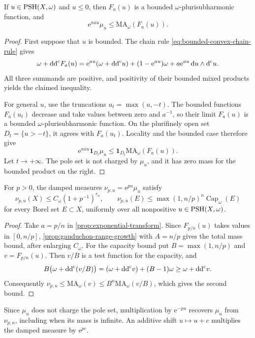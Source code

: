 \begin{proposition}\label{prop:exponential-transform}
If $u\in\mathrm{PSH}(X,\omega)$ and $u\leq0$, then $F_a(u)$ is a bounded $\omega$-plurisubharmonic function, and
\[
 \mathrm{e}^{na u}\mu_u\leq\mathrm{MA}_\omega(F_a(u)).
\]
\end{proposition}
\begin{proof}
First suppose that $u$ is bounded. The chain rule \eqref{eq:bounded-convex-chain-rule} gives
\[
 \omega+\mathrm{dd}^{\mathrm{c}} F_a(u)
 =\mathrm{e}^{au}(\omega+\mathrm{dd}^{\mathrm{c}} u)+(1-\mathrm{e}^{au})\omega
      +a\mathrm{e}^{au}\,\mathrm{d}u\wedge\mathrm d^{\mathrm c} u.
\]
All three summands are positive, and positivity of their bounded mixed products yields the claimed inequality.

For general $u$, use the truncations $u_t=\max(u,-t)$. The bounded functions $F_a(u_t)$ decrease and take values between zero and $a^{-1}$, so their limit $F_a(u)$ is a bounded $\omega$-plurisubharmonic function. On the plurifinely open set $D_t=\{u>-t\}$, it agrees with $F_a(u_t)$. Locality and the bounded case therefore give
\[
 \mathrm{e}^{na u}\mathbf1_{D_t}\mu_u
 \leq\mathbf1_{D_t}\mathrm{MA}_\omega(F_a(u)).
\]
Let $t\to+\infty$. The pole set is not charged by $\mu_u$, and it has zero mass for the bounded product on the right.
\end{proof}

\begin{theorem}\label{thm:exponential-damping}\label{prop:damped-capacity}
For $p>0$, the damped measures $\nu_{p,u}=\mathrm{e}^{pu}\mu_u$ satisfy
\[
 \nu_{p,u}(X)\leq C_\omega(1+p^{-1})^{r_n},
 \qquad
 \nu_{p,u}(E)\leq\max(1,n/p)^n\operatorname{Cap}_\omega(E)
\]
for every Borel set $E\subset X$, uniformly over all nonpositive $u\in\mathrm{PSH}(X,\omega)$.
\end{theorem}
\begin{proof}
Take $a=p/n$ in \cref{prop:exponential-transform}. Since $F_{p/n}(u)$ takes values in $[0,n/p]$, \cref{prop:gauduchon-range-growth} with $A=n/p$ gives the total mass bound, after enlarging $C_\omega$. For the capacity bound put $B=\max(1,n/p)$ and $v=F_{p/n}(u)$. Then $v/B$ is a test function for the capacity, and
\[
 B\bigl(\omega+\mathrm{dd}^{\mathrm{c}}(v/B)\bigr)
 =(\omega+\mathrm{dd}^{\mathrm{c}} v)+(B-1)\omega\geq\omega+\mathrm{dd}^{\mathrm{c}} v.
\]
Consequently $\nu_{p,u}\leq\mathrm{MA}_\omega(v)\leq B^n\mathrm{MA}_\omega(v/B)$, which gives the second bound.
\end{proof}

Since $\mu_u$ does not charge the pole set, multiplication by $\mathrm{e}^{-pu}$ recovers $\mu_u$ from $\nu_{p,u}$, including when its mass is infinite. An additive shift $u\mapsto u+c$ multiplies the damped measure by $\mathrm{e}^{pc}$.

